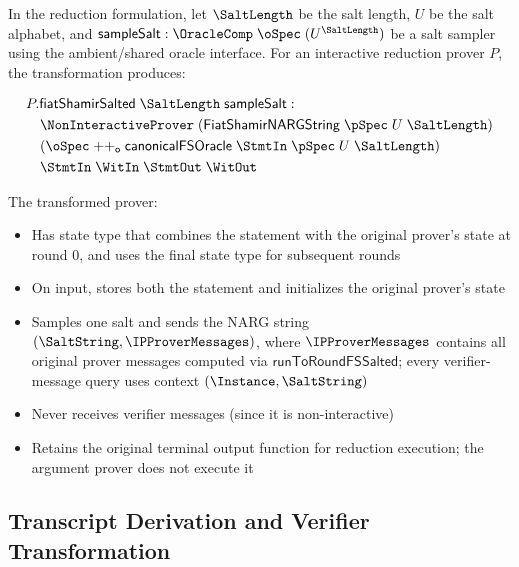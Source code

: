 \begin{definition}
    \label{def:prover_fiat_shamir}
    In the reduction formulation, let \(\SaltLength\) be the salt length, \(U\) be the salt alphabet, and \(\mathsf{sampleSalt}:\OracleComp\;\oSpec\;(U^{\SaltLength})\) be a salt sampler using the ambient/shared oracle interface. For an interactive reduction prover \(P\), the transformation produces:

    \begin{equation*}
    \begin{aligned}
      &P.\mathsf{fiatShamirSalted}\;\SaltLength\;\mathsf{sampleSalt} :\\
      &\quad\NonInteractiveProver\;(\mathsf{FiatShamirNARGString}\;\pSpec\;U\;\SaltLength)\\
      &\quad(\oSpec\mathrel{++_\mathsf{o}}\mathsf{canonicalFSOracle}\;\StmtIn\;\pSpec\;U\;\SaltLength)\\
      &\quad\StmtIn\;\WitIn\;\StmtOut\;\WitOut
    \end{aligned}
    \end{equation*}

    The transformed prover:
    \begin{itemize}
        \item Has state type that combines the statement with the original prover's state at round 0, and uses the final state type for subsequent rounds
        \item On input, stores both the statement and initializes the original prover's state
        \item Samples one salt and sends the NARG string \((\SaltString,\IPProverMessages)\), where \(\IPProverMessages\) contains all original prover messages computed via \(\mathsf{runToRoundFSSalted}\); every verifier-message query uses context \((\Instance,\SaltString)\)
        \item Never receives verifier messages (since it is non-interactive)
        \item Retains the original terminal output function for reduction execution; the argument prover does not execute it
    \end{itemize}
\end{definition}

\subsection{Transcript Derivation and Verifier Transformation}\label{sec:fiat_shamir_verifier}


